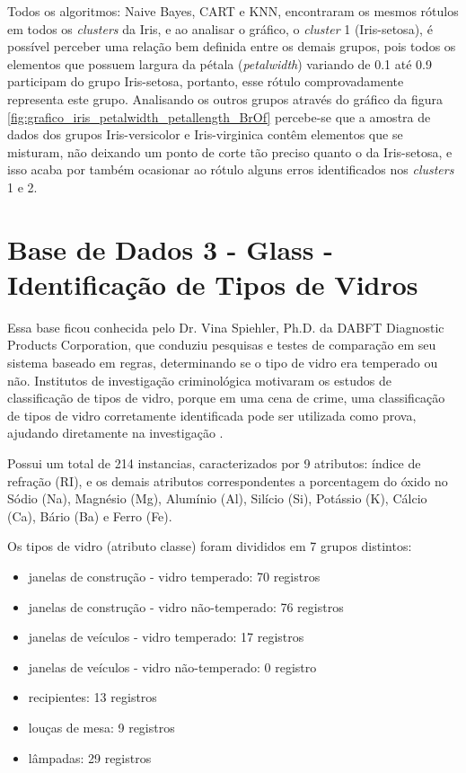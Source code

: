 Todos os algoritmos: Naive Bayes, CART e KNN, encontraram os mesmos rótulos em todos os \textit{clusters} da Iris, e ao analisar o gráfico, o \textit{cluster} 1 (Iris-setosa), é possível perceber uma relação bem definida entre os demais grupos, pois todos os elementos que possuem largura da pétala (\textit{petalwidth}) variando de 0.1 até 0.9 participam do grupo Iris-setosa, portanto, esse rótulo comprovadamente representa este grupo. Analisando os outros grupos através do gráfico da figura \ref{fig:grafico_iris_petalwidth_petallength_BrOf} percebe-se que a amostra de dados dos grupos Iris-versicolor e Iris-virginica contêm elementos que se misturam, não deixando um ponto de corte tão preciso quanto o da Iris-setosa, e isso acaba por também ocasionar ao rótulo alguns erros identificados nos \textit{clusters} 1 e 2.



\section{Base de Dados 3 - Glass - Identificação de Tipos de Vidros}\label{cap:resultados:ssec:iris}

Essa base ficou conhecida pelo Dr. Vina Spiehler, Ph.D. da DABFT Diagnostic Products Corporation, que conduziu pesquisas e testes de comparação em seu sistema baseado em regras, determinando se o tipo de vidro era temperado ou não. Institutos de investigação criminológica motivaram os estudos de classificação de tipos de vidro, porque em uma cena de crime, uma classificação de tipos de vidro corretamente identificada pode ser utilizada como prova, ajudando diretamente na investigação \cite{Evett:1989}.

Possui um total de 214 instancias, caracterizados por 9 atributos: índice de refração (RI), e os demais atributos correspondentes a porcentagem do óxido no Sódio (Na), Magnésio (Mg), Alumínio (Al), Silício (Si), Potássio (K), Cálcio (Ca), Bário (Ba) e Ferro (Fe).

Os tipos de vidro (atributo classe) foram divididos em 7 grupos distintos:
\begin{itemize} [noitemsep]
 \item janelas de construção - vidro temperado: 70 registros
 \item janelas de construção - vidro não-temperado: 76 registros
 \item janelas de veículos - vidro temperado: 17 registros
 \item janelas de veículos - vidro não-temperado: 0 registro
 \item recipientes: 13 registros
 \item louças de mesa: 9 registros
 \item lâmpadas: 29 registros 
\end{itemize}


